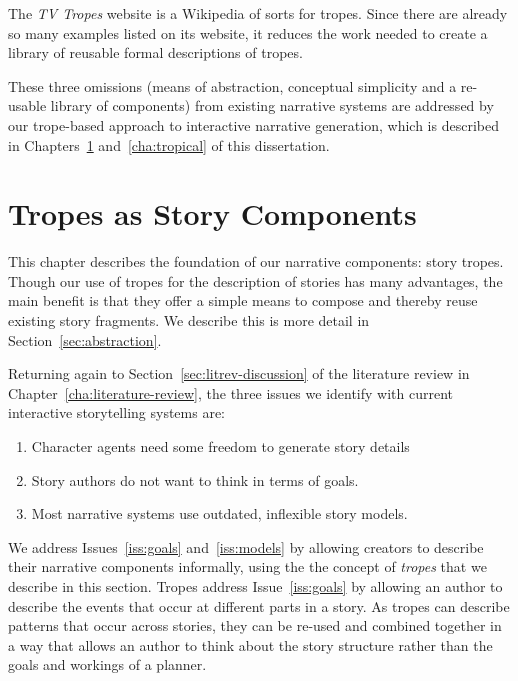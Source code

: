 \documentclass[11pt]{report}
\begin{document}
The \emph{TV Tropes} website is a Wikipedia of sorts for tropes. Since there are
already so many examples listed on its website, it reduces the work needed to
create a library of reusable formal descriptions of tropes.

These three omissions (means of abstraction, conceptual simplicity and a
re-usable library of components) from existing narrative systems are addressed
by our trope-based approach to interactive narrative generation, which is
described in Chapters~\ref{cha:tropes} and~\ref{cha:tropical} of this dissertation.



\chapter{Tropes as Story Components}
\label{cha:tropes}
This chapter describes the foundation of our narrative components: story
tropes. Though our use of tropes for the description of stories has many
advantages, the main benefit is that they offer a simple means to compose and thereby
reuse existing story fragments. We describe this is more detail in Section~\ref{sec:abstraction}.

Returning again to Section~\ref{sec:litrev-discussion} of the literature review in
Chapter~\ref{cha:literature-review}, the three issues we identify with current
interactive storytelling systems are:

\begin{enumerate}[{Issue} 1:]
\item Character agents need some freedom to generate story details
\item Story authors do not want to think in terms of goals.
\item Most narrative systems use outdated, inflexible story models.
\end{enumerate}

We address Issues~\ref{iss:goals} and~\ref{iss:models} by allowing creators to
describe their narrative components informally, using the the concept of
\emph{tropes} that we describe in this section. Tropes address
Issue~\ref{iss:goals} by allowing an author to describe the events that occur at
different parts in a story. As tropes can describe patterns that occur across
stories, they can be re-used and combined together in a way that allows an
author to think about the story structure rather than the goals and workings of
a planner.
\end{document}
